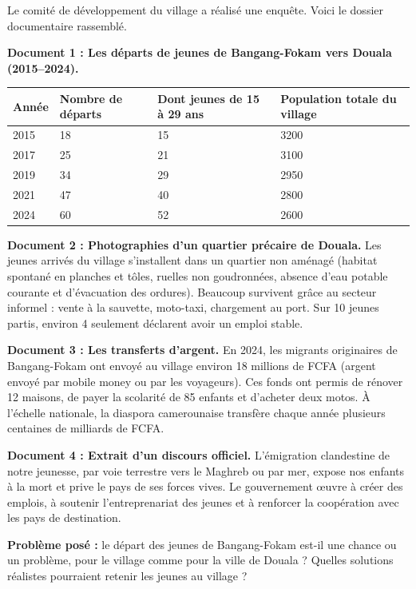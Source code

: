 \documentclass[11pt]{article}
\begin{document}
Le comité de développement du village a réalisé une enquête. Voici le dossier documentaire rassemblé.

\textbf{Document 1 : Les départs de jeunes de Bangang-Fokam vers Douala (2015--2024).}

\begin{center}
\begin{tabularx}{\linewidth}{|l|X|X|X|}\hline
\rowcolor{popblueL} \textbf{Année} & \textbf{Nombre de départs} & \textbf{Dont jeunes de 15 à 29 ans} & \textbf{Population totale du village} \\ \hline
2015 & 18 & 15 & \num{3200} \\ \hline
2017 & 25 & 21 & \num{3100} \\ \hline
2019 & 34 & 29 & \num{2950} \\ \hline
2021 & 47 & 40 & \num{2800} \\ \hline
2024 & 60 & 52 & \num{2600} \\ \hline
\end{tabularx}
\end{center}

\textbf{Document 2 : Photographies d'un quartier précaire de Douala.} Les jeunes arrivés du village s'installent dans un quartier non aménagé (habitat spontané en planches et tôles, ruelles non goudronnées, absence d'eau potable courante et d'évacuation des ordures). Beaucoup survivent grâce au secteur informel : vente à la sauvette, moto-taxi, chargement au port. Sur 10 jeunes partis, environ 4 seulement déclarent avoir un emploi stable.

\textbf{Document 3 : Les transferts d'argent.} En 2024, les migrants originaires de Bangang-Fokam ont envoyé au village environ 18 millions de FCFA (argent envoyé par mobile money ou par les voyageurs). Ces fonds ont permis de rénover 12 maisons, de payer la scolarité de 85 enfants et d'acheter deux motos. À l'échelle nationale, la diaspora camerounaise transfère chaque année plusieurs centaines de milliards de FCFA.

\textbf{Document 4 : Extrait d'un discours officiel.} \og L'émigration clandestine de notre jeunesse, par voie terrestre vers le Maghreb ou par mer, expose nos enfants à la mort et prive le pays de ses forces vives. Le gouvernement œuvre à créer des emplois, à soutenir l'entreprenariat des jeunes et à renforcer la coopération avec les pays de destination. \fg

\textbf{Problème posé :} le départ des jeunes de Bangang-Fokam est-il une chance ou un problème, pour le village comme pour la ville de Douala ? Quelles solutions réalistes pourraient retenir les jeunes au village ?
\end{document}
